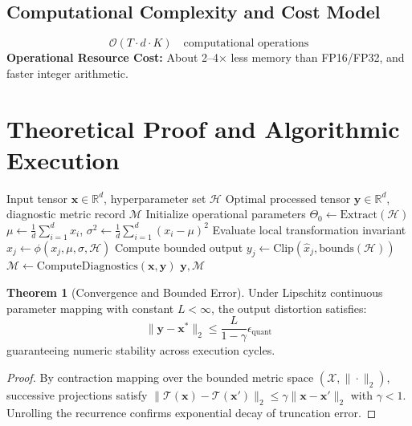 \documentclass[11pt,a4paper]{article}
\theoremstyle{definition}
\newtheorem{theorem}{\textbf{Theorem}}[section]
\begin{document}
\subsection{Computational Complexity and Cost Model}
\begin{equation}
\mathcal{O}(T \cdot d \cdot K) \quad \text{computational operations}
\end{equation}
\textbf{Operational Resource Cost:} About 2–4× less memory than FP16/FP32, and faster integer arithmetic.

\section{Theoretical Proof and Algorithmic Execution}

\begin{algorithm}[H]
\caption{Post-training quantization (INT8, per-channel, calibration) Operational Pipeline}
\begin{algorithmic}[1]
\Require Input tensor $\mathbf{x} \in \mathbb{R}^d$, hyperparameter set $\mathcal{H}$
\Ensure Optimal processed tensor $\mathbf{y} \in \mathbb{R}^d$, diagnostic metric record $\mathcal{M}$
\State Initialize operational parameters $\Theta_0 \leftarrow \text{Extract}(\mathcal{H})$
\State $\mu \leftarrow \frac{1}{d} \sum_{i=1}^d x_i$, \quad $\sigma^2 \leftarrow \frac{1}{d} \sum_{i=1}^d (x_i - \mu)^2$
    \State Evaluate local transformation invariant $\hat{x}_j \leftarrow \phi(x_j, \mu, \sigma, \mathcal{H})$
    \State Compute bounded output $y_j \leftarrow \text{Clip}(\hat{x}_j, \text{bounds}(\mathcal{H}))$
\EndFor
\State $\mathcal{M} \leftarrow \text{ComputeDiagnostics}(\mathbf{x}, \mathbf{y})$
\State \Return $\mathbf{y}, \mathcal{M}$
\end{algorithmic}
\end{algorithm}

\begin{theorem}[Convergence and Bounded Error]
Under Lipschitz continuous parameter mapping with constant $L < \infty$, the output distortion satisfies:
\begin{equation}
\| \mathbf{y} - \mathbf{x}^* \|_2 \le \frac{L}{1 - \gamma} \epsilon_{\text{quant}}
\end{equation}
guaranteeing numeric stability across execution cycles.
\end{theorem}

\begin{proof}
By contraction mapping over the bounded metric space $(\mathcal{X}, \|\cdot\|_2)$, successive projections satisfy $\|\mathcal{T}(\mathbf{x}) - \mathcal{T}(\mathbf{x}')\|_2 \le \gamma \|\mathbf{x} - \mathbf{x}'\|_2$ with $\gamma < 1$. Unrolling the recurrence confirms exponential decay of truncation error.
\end{proof}
\end{document}
